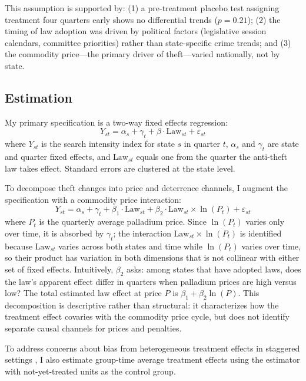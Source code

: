 \documentclass[12pt]{article}
\begin{document}
This assumption is supported by: (1) a pre-treatment placebo test assigning treatment four quarters early shows no differential trends ($p = 0.21$); (2) the timing of law adoption was driven by political factors (legislative session calendars, committee priorities) rather than state-specific crime trends; and (3) the commodity price---the primary driver of theft---varied nationally, not by state.

\subsection{Estimation}

My primary specification is a two-way fixed effects regression:
\begin{equation}
Y_{st} = \alpha_s + \gamma_t + \beta \cdot \text{Law}_{st} + \varepsilon_{st}
\label{eq:twfe}
\end{equation}
where $Y_{st}$ is the search intensity index for state $s$ in quarter $t$, $\alpha_s$ and $\gamma_t$ are state and quarter fixed effects, and $\text{Law}_{st}$ equals one from the quarter the anti-theft law takes effect. Standard errors are clustered at the state level.

To decompose theft changes into price and deterrence channels, I augment the specification with a commodity price interaction:
\begin{equation}
Y_{st} = \alpha_s + \gamma_t + \beta_1 \cdot \text{Law}_{st} + \beta_2 \cdot \text{Law}_{st} \times \ln(P_t) + \varepsilon_{st}
\label{eq:interaction}
\end{equation}
where $P_t$ is the quarterly average palladium price. Since $\ln(P_t)$ varies only over time, it is absorbed by $\gamma_t$; the interaction $\text{Law}_{st} \times \ln(P_t)$ is identified because $\text{Law}_{st}$ varies across both states and time while $\ln(P_t)$ varies over time, so their product has variation in both dimensions that is not collinear with either set of fixed effects. Intuitively, $\beta_2$ asks: among states that have adopted laws, does the law's apparent effect differ in quarters when palladium prices are high versus low? The total estimated law effect at price $P$ is $\beta_1 + \beta_2 \ln(P)$. This decomposition is descriptive rather than structural: it characterizes how the treatment effect covaries with the commodity price cycle, but does not identify separate causal channels for prices and penalties.

To address concerns about bias from heterogeneous treatment effects in staggered settings \citep{goodmanbacon2021difference, sun2021estimating}, I also estimate group-time average treatment effects using the \citet{callaway2021difference} estimator with not-yet-treated units as the control group.
\end{document}
